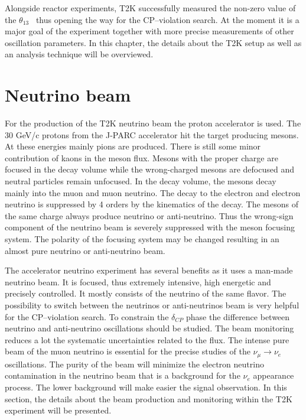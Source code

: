 \documentclass[../main.tex]{subfiles}
\begin{document}
Alongside reactor experiments, T2K successfully measured the non-zero value of the $\theta_{13}$~\cite{Abe2014a, An2012} thus opening the way for the CP--violation search. At the moment it is a major goal of the experiment together with more precise measurements of other oscillation parameters. In this chapter, the details about the T2K setup as well as an analysis technique will be overviewed.

\section{Neutrino beam}
\label{ch:T2K:nu_beam}

For the production of the T2K neutrino beam the proton accelerator is used. The 30 GeV/c protons from the J-PARC accelerator hit the target producing mesons. At these energies mainly pions are produced. There is still some minor contribution of kaons in the meson flux. Mesons with the proper charge are focused in the decay volume while the wrong-charged mesons are defocused and neutral particles remain unfocused. In the decay volume, the mesons decay mainly into the muon and muon neutrino. The decay to the electron and electron neutrino is suppressed by 4 orders by the kinematics of the decay. The mesons of the same charge always produce neutrino or anti-neutrino. Thus the wrong-sign component of the neutrino beam is severely suppressed with the meson focusing system. The polarity of the focusing system may be changed resulting in an almost pure neutrino or anti-neutrino beam.

The accelerator neutrino experiment has several benefits as it uses a man-made neutrino beam. It is focused, thus extremely intensive, high energetic and precisely controlled. It mostly consists of the neutrino of the same flavor. The possibility to switch between the neutrinos or anti-neutrinos beam is very helpful for the CP--violation search. To constrain the $\delta_{CP}$ phase the difference between neutrino and anti-neutrino oscillations should be studied. The beam monitoring reduces a lot the systematic uncertainties related to the flux. The intense pure beam of the muon neutrino is essential for the precise studies of the $\nu_\mu\to\nu_e$ oscillations. The purity of the beam will minimize the electron neutrino contamination in the neutrino beam that is a background for the $\nu_e$ appearance process. The lower background will make easier the signal observation. In this section, the details about the beam production and monitoring within the T2K experiment will be presented.
\end{document}
